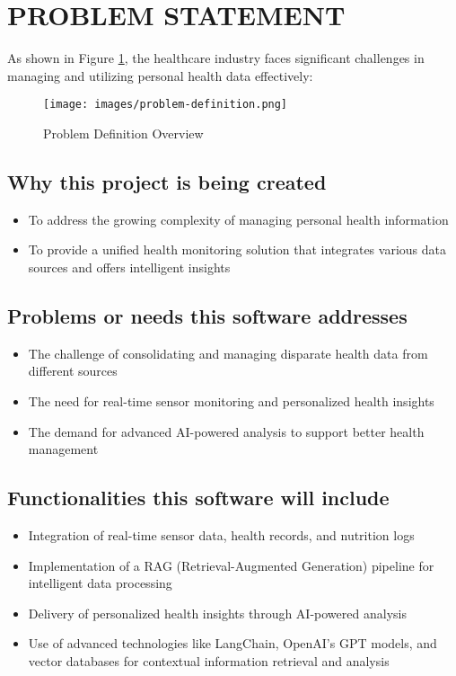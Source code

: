 \section{PROBLEM STATEMENT}

As shown in Figure \ref{fig:problem-definition}, the healthcare industry faces significant challenges in managing and utilizing personal health data effectively:

\begin{figure}[H]
    \centering
    \texttt{[image: images/problem-definition.png]}
    \caption{Problem Definition Overview}
    \label{fig:problem-definition}
\end{figure}

\subsection{Why this project is being created}
\begin{itemize}
    \item To address the growing complexity of managing personal health information
    \item To provide a unified health monitoring solution that integrates various data sources and offers intelligent insights
\end{itemize}

\subsection{Problems or needs this software addresses}
\begin{itemize}
    \item The challenge of consolidating and managing disparate health data from different sources
    \item The need for real-time sensor monitoring and personalized health insights
    \item The demand for advanced AI-powered analysis to support better health management
\end{itemize}

\subsection{Functionalities this software will include}
\begin{itemize}
    \item Integration of real-time sensor data, health records, and nutrition logs
    \item Implementation of a RAG (Retrieval-Augmented Generation) pipeline for intelligent data processing
    \item Delivery of personalized health insights through AI-powered analysis
    \item Use of advanced technologies like LangChain, OpenAI's GPT models, and vector databases for contextual information retrieval and analysis
\end{itemize} 